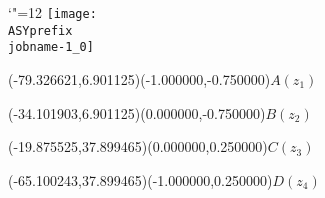 \setlength{\unitlength}{1pt}%
\makeatletter%
\let\ASYencoding\f@encoding%
\let\ASYfamily\f@family%
\let\ASYseries\f@series%
\let\ASYshape\f@shape%
\makeatother%
{\catcode`"=12%
\texttt{[image: \\ASYprefix\\jobname-1\_0]}%
}%
%
\fontsize{6.000000}{7.200000}\selectfont%
\usefont{\ASYencoding}{\ASYfamily}{\ASYseries}{\ASYshape}%
\ASYalign(-79.326621,6.901125)(-1.000000,-0.750000){$A(z_1)$}%
%
\fontsize{6.000000}{7.200000}\selectfont%
\ASYalign(-34.101903,6.901125)(0.000000,-0.750000){$B(z_2)$}%
%
\fontsize{6.000000}{7.200000}\selectfont%
\ASYalign(-19.875525,37.899465)(0.000000,0.250000){$C(z_3)$}%
%
\fontsize{6.000000}{7.200000}\selectfont%
\ASYalign(-65.100243,37.899465)(-1.000000,0.250000){$D(z_4)$}%
